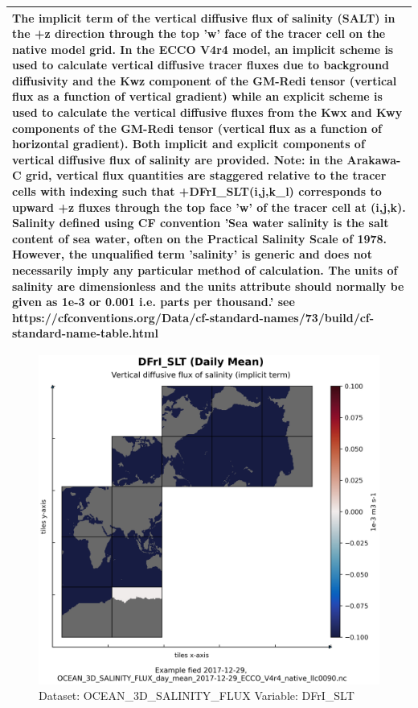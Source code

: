 \begin{longtable}{|p{}|p{}|p{}|p{}|}
\multicolumn{4}{|p{1\textwidth}|}{The implicit term of the vertical diffusive flux of salinity (SALT) in the +z direction through the top 'w' face of the tracer cell on the native model grid. In the ECCO V4r4 model, an implicit scheme is used to calculate vertical diffusive tracer fluxes due to background diffusivity and the Kwz component of the GM-Redi tensor (vertical flux as a function of vertical gradient) while an explicit scheme is used to calculate the vertical diffusive fluxes from the Kwx and Kwy components of the GM-Redi tensor (vertical flux as a function of horizontal gradient). Both implicit and explicit components of vertical diffusive flux of salinity are provided. Note: in the Arakawa-C grid, vertical flux quantities are staggered relative to the tracer cells with indexing such that +DFrI\_SLT(i,j,k\_l) corresponds to upward +z fluxes through the top face 'w' of the tracer cell at (i,j,k). Salinity defined using CF convention 'Sea water salinity is the salt content of sea water, often on the Practical Salinity Scale of 1978. However, the unqualified term 'salinity' is generic and does not necessarily imply any particular method of calculation. The units of salinity are dimensionless and the units attribute should normally be given as 1e-3 or 0.001 i.e. parts per thousand.' see https://cfconventions.org/Data/cf-standard-names/73/build/cf-standard-name-table.html} \\ \hline
\end{longtable}

\begin{figure}[H]
\centering
\includegraphics[width=\textwidth]{../images/plots/native_plots/Ocean_Three-Dimensional_Salinity_Fluxes/DFrI_SLT.png}
\caption{Dataset: OCEAN\_3D\_SALINITY\_FLUX Variable: DFrI\_SLT}
\label{tab:table-OCEAN_3D_SALINITY_FLUX_DFrI_SLT-Plot}
\end{figure}
\pagebreak

